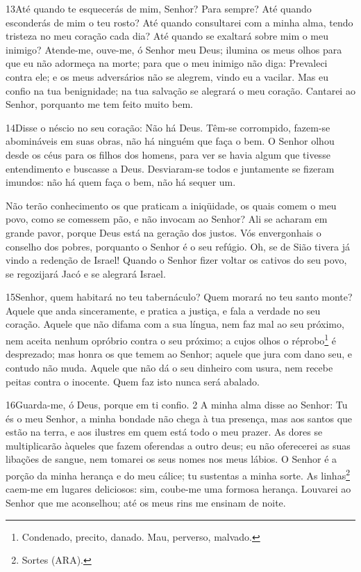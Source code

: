 \bigskip

\lettrine{13}{}Até quando te esquecerás de mim, Senhor? Para
sempre? Até quando esconderás de mim o teu rosto? Até quando
consultarei com a minha alma, tendo tristeza no meu coração cada
dia? Até quando se exaltará sobre mim o meu inimigo? Atende-me,
ouve-me, ó Senhor meu Deus; ilumina os meus olhos para que eu não
adormeça na morte; para que o meu inimigo não diga: Prevaleci
contra ele; e os meus adversários não se alegrem, vindo eu a
vacilar. Mas eu confio na tua benignidade; na tua salvação se
alegrará o meu coração. Cantarei ao Senhor, porquanto me tem
feito muito bem.

\bigskip

\lettrine{14}{}Disse o néscio no seu coração: Não há Deus.
Têm-se corrompido, fazem-se abomináveis em suas obras, não há
ninguém que faça o bem. O Senhor olhou desde os céus para os
filhos dos homens, para ver se havia algum que tivesse entendimento
e buscasse a Deus. Desviaram-se todos e juntamente se fizeram
imundos: não há quem faça o bem, não há sequer um.

Não terão conhecimento os que praticam a iniqüidade, os quais
comem o meu povo, como se comessem pão, e não invocam ao Senhor?
Ali se acharam em grande pavor, porque Deus está na geração dos
justos. Vós envergonhais o conselho dos pobres, porquanto o
Senhor é o seu refúgio. Oh, se de Sião tivera já vindo a
redenção de Israel! Quando o Senhor fizer voltar os cativos do seu
povo, se regozijará Jacó e se alegrará Israel.

\bigskip

\lettrine{15}{}Senhor, quem habitará no teu tabernáculo? Quem
morará no teu santo monte? Aquele que anda sinceramente, e
pratica a justiça, e fala a verdade no seu coração. Aquele que
não difama com a sua língua, nem faz mal ao seu próximo, nem aceita
nenhum opróbrio contra o seu próximo; a cujos olhos o
réprobo\footnote{Condenado, precito, danado. Mau, perverso,
malvado.} é desprezado; mas honra os que temem ao Senhor; aquele que
jura com dano seu, e contudo não muda. Aquele que não dá o seu
dinheiro com usura, nem recebe peitas contra o inocente. Quem faz
isto nunca será abalado.

\bigskip

\lettrine{16}{}Guarda-me, ó Deus, porque em ti confio. 2 A
minha alma disse ao Senhor: Tu és o meu Senhor, a minha bondade não
chega à tua presença, mas aos santos que estão na terra, e aos
ilustres em quem está todo o meu prazer. As dores se
multiplicarão àqueles que fazem oferendas a outro deus; eu não
oferecerei as suas libações de sangue, nem tomarei os seus nomes nos
meus lábios. O Senhor é a porção da minha herança e do meu
cálice; tu sustentas a minha sorte. As linhas\footnote{Sortes
(ARA).} caem-me em lugares deliciosos: sim, coube-me uma formosa
herança. Louvarei ao Senhor que me aconselhou; até os meus rins
me ensinam de noite.

